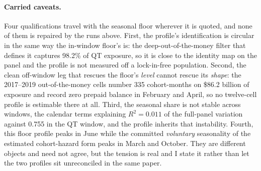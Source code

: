 \documentclass[12pt]{article}
\begin{document}
\paragraph{Carried caveats.} Four qualifications travel with the seasonal floor wherever it is quoted, and none of them is repaired by the runs above. First, the profile's identification is circular in the same way the in-window floor's is: the deep-out-of-the-money filter that defines it captures 98.2\% of QT exposure, so it is close to the identity map on the panel and the profile is not measured off a lock-in-free population. Second, the clean off-window leg that rescues the floor's \emph{level} cannot rescue its \emph{shape}: the 2017--2019 out-of-the-money cells number 335 cohort-months on \$86.2 billion of exposure and record zero prepaid balance in February and April, so no twelve-cell profile is estimable there at all. Third, the seasonal share is not stable across windows, the calendar terms explaining $R^2 = 0.011$ of the full-panel variation against 0.755 in the QT window, and the profile inherits that instability. Fourth, this floor profile peaks in June while the committed \emph{voluntary} seasonality of the estimated cohort-hazard form peaks in March and October. They are different objects and need not agree, but the tension is real and I state it rather than let the two profiles sit unreconciled in the same paper.
\end{document}
